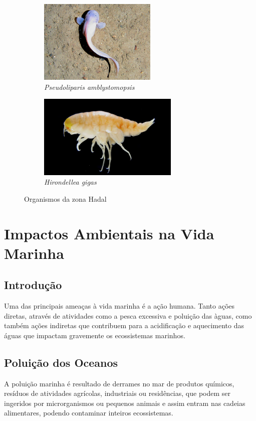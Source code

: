 \documentclass{report}
\begin{document}
\begin{figure}[H]
\center
    \begin{subfigure}{.5\textwidth}
    \center
        \includegraphics[height=4cm]{imagens/snailfish.jpg}
        \caption{\textit{Pseudoliparis amblystomopsis}}
        \label{fig:snailfish}
    \end{subfigure}%
    \begin{subfigure}{.5\textwidth}
    \center
        \includegraphics[height=4cm]{imagens/amphipod.png}
        \caption{\textit{Hirondellea gigas}}
        \label{fig:amphipod}
    \end{subfigure}
    \caption{Organismos da zona Hadal}
    \label{fig:peixesHadal}
\end{figure}


\chapter{Impactos Ambientais na Vida Marinha}
\label{chap.impactos}

\section{Introdução}
\label{introducao}
Uma das principais ameaças à vida marinha é a ação humana. Tanto ações diretas, através de atividades como a pesca excessiva e poluição das àguas, como também ações indiretas que contribuem para a acidificação e aquecimento das águas que impactam gravemente os ecossistemas marinhos.


\section{Poluição dos Oceanos}
\label{poluicao}
A poluição marinha é resultado de derrames no mar de produtos químicos, resíduos de atividades agrícolas, industriais ou residências, que podem ser ingeridos por microrganismos ou pequenos animais e assim entram nas cadeias alimentares, podendo contaminar inteiros ecossistemas. 
\end{document}
